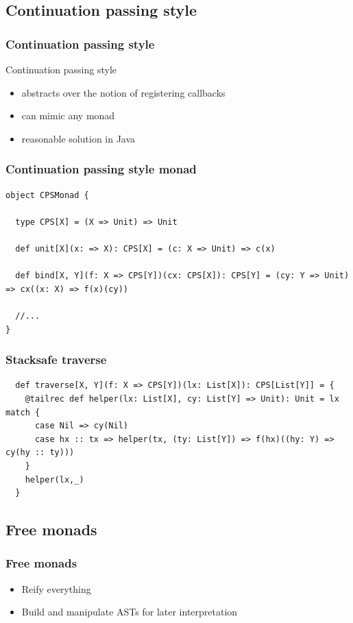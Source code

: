 \documentclass{beamer}
\begin{document}
\subsection{Continuation passing style}
\begin{frame}
\frametitle{Continuation passing style}
Continuation passing style
\begin{itemize}
\item abstracts over the notion of registering callbacks
\item can mimic any monad
\item reasonable solution in Java
\end{itemize}
\end{frame}

\begin{frame}[fragile]
\frametitle{Continuation passing style monad}
\begin{lstlisting}
object CPSMonad {

  type CPS[X] = (X => Unit) => Unit

  def unit[X](x: => X): CPS[X] = (c: X => Unit) => c(x)

  def bind[X, Y](f: X => CPS[Y])(cx: CPS[X]): CPS[Y] = (cy: Y => Unit) => cx((x: X) => f(x)(cy))
  
  //...
}
\end{lstlisting}
\end{frame}
\begin{frame}[fragile]
\frametitle{Stacksafe traverse}
\begin{lstlisting}
  def traverse[X, Y](f: X => CPS[Y])(lx: List[X]): CPS[List[Y]] = {
    @tailrec def helper(lx: List[X], cy: List[Y] => Unit): Unit = lx match {
      case Nil => cy(Nil)
      case hx :: tx => helper(tx, (ty: List[Y]) => f(hx)((hy: Y) => cy(hy :: ty)))
    }
    helper(lx,_)
  }
\end{lstlisting}
\end{frame}

\subsection{Free monads}
\begin{frame}
\frametitle{Free monads}
\begin{itemize}
\item Reify everything
\item Build and manipulate ASTs for later interpretation
\end{itemize}
\end{frame}
\end{document}
